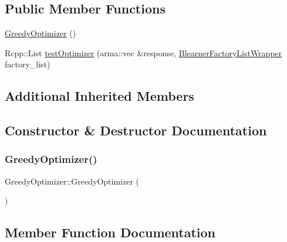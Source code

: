 \subsection*{Public Member Functions}
\begin{DoxyCompactItemize}
\item 
\mbox{\hyperlink{class_greedy_optimizer_a86fd72eb73c5ade01321b7da50529ecb}{Greedy\+Optimizer}} ()
\item 
Rcpp\+::\+List \mbox{\hyperlink{class_greedy_optimizer_a30925396579c7cfb5b90b8c131495f3a}{test\+Optimizer}} (arma\+::vec \&response, \mbox{\hyperlink{class_blearner_factory_list_wrapper}{Blearner\+Factory\+List\+Wrapper}} factory\+\_\+list)
\end{DoxyCompactItemize}
\subsection*{Additional Inherited Members}


\subsection{Constructor \& Destructor Documentation}
\mbox{\label{class_greedy_optimizer_a86fd72eb73c5ade01321b7da50529ecb}} 
\subsubsection{\texorpdfstring{Greedy\+Optimizer()}{GreedyOptimizer()}}
{\footnotesize\ttfamily Greedy\+Optimizer\+::\+Greedy\+Optimizer (\begin{DoxyParamCaption}{ }\end{DoxyParamCaption})\hspace{0.3cm}{\ttfamily [inline]}}



\subsection{Member Function Documentation}
\mbox{\label{class_greedy_optimizer_a30925396579c7cfb5b90b8c131495f3a}} 
